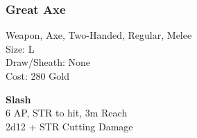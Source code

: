 \subsubsection{Great Axe}\label{weapon:greatAxe}
Weapon, Axe, Two-Handed, Regular, Melee\\
Size: L\\
Draw/Sheath: None\\
Cost: 280 Gold

\textbf{Slash}\\
6 AP, STR to hit, 3m Reach\\
2d12 + STR Cutting Damage
